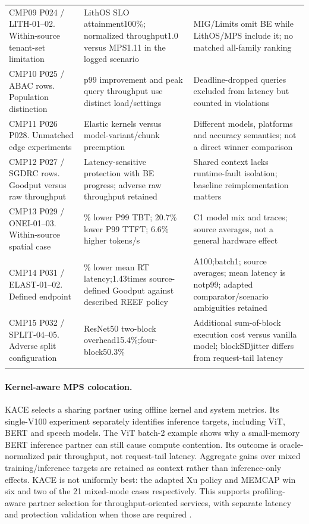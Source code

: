 \begin{longtable}{>{\raggedright\arraybackslash}p{}>{\raggedright\arraybackslash}p{}>{\raggedright\arraybackslash}p{}}
CMP09 P024 / LITH-01--02. Within-source tenant-set limitation & LithOS SLO attainment100\%; normalized throughput1.0 versus MPS1.11 in the logged scenario & MIG/Limits omit BE while LithOS/MPS include it; no matched all-family ranking\\\addlinespace
CMP10 P025 / ABAC rows. Population distinction & p99 improvement and peak query throughput use distinct load/settings & Deadline-dropped queries excluded from latency but counted in violations\\\addlinespace
CMP11 P026 P028. Unmatched edge experiments & Elastic kernels versus model-variant/chunk preemption & Different models, platforms and accuracy semantics; not a direct winner comparison\\\addlinespace
CMP12 P027 / SGDRC rows. Goodput versus raw throughput & Latency-sensitive protection with BE progress; adverse raw throughput retained & Shared context lacks runtime-fault isolation; baseline reimplementation matters\\\addlinespace
CMP13 P029 / ONEI-01--03. Within-source spatial case & 65.5\% lower P99 TBT; 20.7\% lower P99 TTFT; 6.6\% higher tokens/s & C1 model mix and traces; source averages, not a general hardware effect\\\addlinespace
CMP14 P031 / ELAST-01--02. Defined endpoint & 22\% lower mean RT latency;1.43times source-defined Goodput against described REEF policy & A100;batch1; source averages; mean latency is notp99; adapted comparator/scenario ambiguities retained\\\addlinespace
CMP15 P032 / SPLIT-04--05. Adverse split configuration & ResNet50 two-block overhead15.4\%;four-block50.3\% & Additional sum-of-block execution cost versus vanilla model; blockSDjitter differs from request-tail latency\\\addlinespace
\bottomrule\end{longtable}
\paragraph{Kernel-aware MPS colocation.} KACE selects a sharing partner using offline kernel and system metrics. Its single-V100 experiment separately identifies inference targets, including ViT, BERT and speech models. The ViT batch-2 example shows why a small-memory BERT inference partner can still cause compute contention. Its outcome is oracle-normalized pair throughput, not request-tail latency. Aggregate gains over mixed training/inference targets are retained as context rather than inference-only effects. KACE is not uniformly best: the adapted Xu policy and MEMCAP win six and two of the 21 mixed-mode cases respectively. This supports profiling-aware partner selection for throughput-oriented services, with separate latency and protection validation when those are required \cite{s030}.
